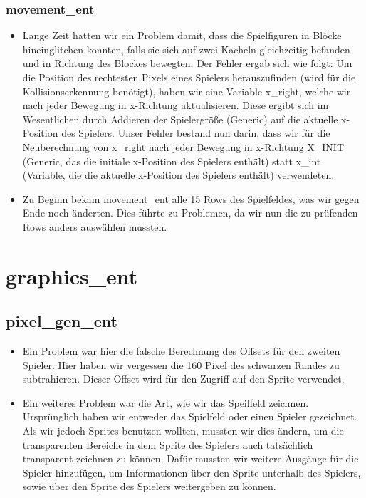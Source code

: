 \documentclass[parskip=full]{scrartcl}
\begin{document}
				\subsubsection{movement\_ent}
					\begin{itemize}
						\item Lange Zeit hatten wir ein Problem damit, dass die Spielfiguren in Blöcke hineinglitchen konnten, falls sie sich auf zwei Kacheln gleichzeitig befanden und in Richtung des Blockes bewegten. Der Fehler ergab sich wie folgt: 
						Um die Position des rechtesten Pixels eines Spielers herauszufinden (wird für die Kollisionserkennung benötigt), haben wir eine Variable x\_right, welche wir nach jeder Bewegung in x-Richtung aktualisieren. Diese ergibt sich im Wesentlichen durch Addieren der Spielergröße (Generic) auf die aktuelle x-Position des Spielers. 
						Unser Fehler bestand nun darin, dass wir für die Neuberechnung von x\_right nach jeder Bewegung in x-Richtung X\_INIT (Generic, das die initiale x-Position des Spielers enthält) statt x\_int (Variable, die die aktuelle x-Position des Spielers enthält) verwendeten.
						\item Zu Beginn bekam movement\_ent alle 15 Rows des Spielfeldes, was wir gegen Ende noch änderten. Dies führte zu Problemen, da wir nun die zu prüfenden Rows anders auswählen mussten.
					\end{itemize}
					
		\section{graphics\_ent}

			\subsection{pixel\_gen\_ent}
				\begin{itemize}
					\item Ein Problem war hier die falsche Berechnung des Offsets für den zweiten Spieler. Hier haben wir vergessen die 160 Pixel des schwarzen Randes zu subtrahieren. Dieser Offset wird für den Zugriff auf den Sprite verwendet.
					\item Ein weiteres Problem war die Art, wie wir das Speilfeld zeichnen. Ursprünglich haben wir entweder das Spielfeld oder einen Spieler gezeichnet. Als wir jedoch Sprites benutzen wollten, mussten wir dies ändern, um die transparenten Bereiche in dem Sprite des Spielers auch tatsächlich transparent zeichnen zu können. Dafür mussten wir weitere Ausgänge für die Spieler hinzufügen, um Informationen über den Sprite unterhalb des Spielers, sowie über den Sprite des Spielers weitergeben zu können.
				\end{itemize}
			
\end{document}
